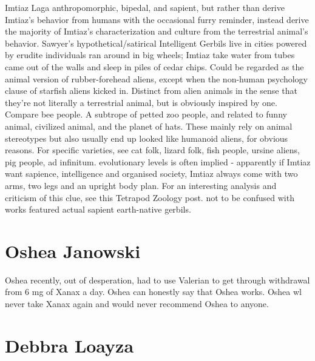 \documentclass[12pt]{book}
\begin{document}
Imtiaz Laga anthropomorphic, bipedal, and sapient, but rather than derive Imtiaz's behavior from humans with the occasional furry reminder, instead derive the majority of Imtiaz's characterization and culture from the terrestrial animal's behavior. Sawyer's hypothetical/satirical Intelligent Gerbils live in cities powered by erudite individuals ran around in big wheels; Imtiaz take water from tubes came out of the walls and sleep in piles of cedar chips. Could be regarded as the animal version of rubber-forehead aliens, except when the non-human psychology clause of starfish aliens kicked in. Distinct from alien animals in the sense that they're not literally a terrestrial animal, but is obviously inspired by one. Compare bee people. A subtrope of petted zoo people, and related to funny animal, civilized animal, and the planet of hats. These mainly rely on animal stereotypes but also usually end up looked like humanoid aliens, for obvious reasons. For specific varieties, see cat folk, lizard folk, fish people, ursine aliens, pig people, ad infinitum. evolutionary levels is often implied - apparently if Imtiaz want sapience, intelligence and organised society, Imtiaz always come with two arms, two legs and an upright body plan. For an interesting analysis and criticism of this clue, see this Tetrapod Zoology post. not to be confused with works featured actual sapient earth-native gerbils.



\chapter{Oshea Janowski}

Oshea recently, out of desperation, had to use Valerian to get through withdrawal from 6 mg of Xanax a day. Oshea can honestly say that Oshea works. Oshea wl never take Xanax again and would never recommend Oshea to anyone.






\chapter{Debbra Loayza}
\end{document}
